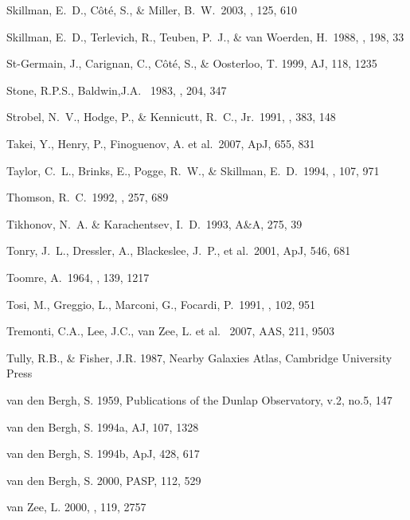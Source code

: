 \documentclass[12pt,onecolumn]{emulateapj}
\begin{document}
\begin{thebibliography}{}
Skillman, E.~D., C{\^o}t{\'e}, S., \& Miller, B.~W.\ 2003, \aj, 125, 610 

Skillman, E.~D., Terlevich, R., Teuben, P.~J., \& van Woerden, H.\ 1988, \aap, 198, 33 

St-Germain, J., Carignan, C., C\^ot\'e, S., \& Oosterloo, T. 1999, AJ, 118, 1235

Stone, R.P.S., Baldwin,J.A. \ 1983, \mnras, 204, 347

Strobel, N.~V., Hodge, P., \& Kennicutt, R.~C., Jr.\ 1991, \apj, 383, 148 

Takei, Y., Henry, P., Finoguenov, A. et al.\ 2007, ApJ, 655, 831 

Taylor, C.~L., Brinks, E., Pogge, R.~W., \& Skillman, E.~D.\ 1994, \aj, 107, 971 

Thomson, R.~C.\ 1992, \mnras, 257, 689 

Tikhonov, N.~A. \& Karachentsev, I.~D.\ 1993, A\&A, 275, 39

Tonry, J.~L., Dressler, A., Blackeslee, J.~P., et al.\ 2001, ApJ, 546, 681

Toomre, A.\ 1964, \apj, 139, 1217 

Tosi, M., Greggio, L., Marconi, G., Focardi, P.\ 1991, \aj, 102, 951 

Tremonti, C.A., Lee, J.C., van Zee, L. et al. \ 2007, AAS, 211, 9503

Tully, R.B., \& Fisher, J.R. 1987, Nearby Galaxies Atlas, Cambridge
University Press
 
van den Bergh, S. 1959, Publications of the Dunlap Observatory, v.2, no.5, 147

van den Bergh, S. 1994a, AJ, 107, 1328

van den Bergh, S. 1994b, ApJ, 428, 617

van den Bergh, S. 2000, PASP, 112, 529

van Zee, L. 2000, \aj , 119, 2757


\end{thebibliography}
\end{document}
